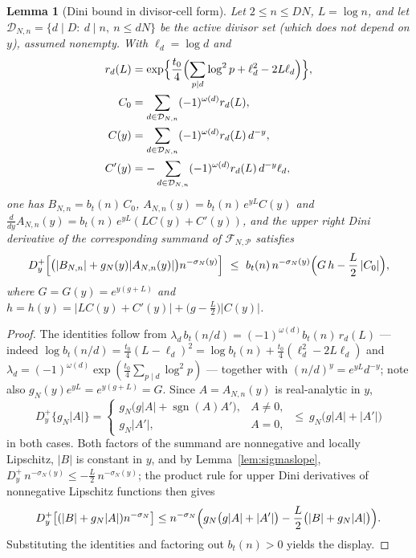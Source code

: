 \documentclass[11pt]{article}
\newtheorem{lemma}[theorem]{Lemma}
\theoremstyle{definition}
\newcommand{\calP}{\mathcal{P}}
\begin{document}
\begin{lemma}[Dini bound in divisor-cell form]\label{lem:dini}
Let $2\le n\le DN$, $L=\log n$, and let
$\mathcal D_{N,n}=\{d\mid D:\ d\mid n,\ n\le dN\}$ be the active
divisor set (which does not depend on $y$), assumed nonempty. With
$\ell_d=\log d$ and
\begin{align*}
r_d(L) &= \exp\Bigl\{\frac{t_0}4\Bigl(\sum_{p\mid d}\log^2p
+\ell_d^2-2L\ell_d\Bigr)\Bigr\},
\\
C_0 &= \sum_{d\in\mathcal D_{N,n}}(-1)^{\omega(d)}r_d(L),
\\
C(y) &= \sum_{d\in\mathcal D_{N,n}}(-1)^{\omega(d)}r_d(L)\,d^{-y},
\\
C'(y) &= -\sum_{d\in\mathcal D_{N,n}}(-1)^{\omega(d)}r_d(L)\,
d^{-y}\ell_d,
\end{align*}
one has $B_{N,n}=b_t(n)\,C_0$,
$A_{N,n}(y)=b_t(n)\,e^{yL}C(y)$ and
$\frac{d}{dy}A_{N,n}(y)=b_t(n)\,e^{yL}(LC(y)+C'(y))$, and the upper
right Dini derivative of the corresponding summand of
$\mathcal F_{N,\calP}$ satisfies
\[
D^+_y\Bigl[\bigl(|B_{N,n}|+g_N(y)|A_{N,n}(y)|\bigr)
n^{-\sigma_N(y)}\Bigr]
\ \le\
b_t(n)\,n^{-\sigma_N(y)}
\Bigl(G\,h-\frac L2\,|C_0|\Bigr),
\]
where $G=G(y)=e^{y(g+L)}$ and
$h=h(y)=|LC(y)+C'(y)|+\bigl(g-\tfrac L2\bigr)|C(y)|$.
\end{lemma}

\begin{proof}
The identities follow from
$\lambda_d\,b_t(n/d)=(-1)^{\omega(d)}b_t(n)\,r_d(L)$ --- indeed
$\log b_t(n/d)=\frac{t_0}4(L-\ell_d)^2
=\log b_t(n)+\frac{t_0}4(\ell_d^2-2L\ell_d)$ and
$\lambda_d=(-1)^{\omega(d)}\exp(\frac{t_0}4\sum_{p\mid d}\log^2p)$
--- together with $(n/d)^y=e^{yL}d^{-y}$; note also
$g_N(y)e^{yL}=e^{y(g+L)}=G$. Since $A=A_{N,n}(y)$ is real-analytic
in $y$,
\[
D^+_y\bigl\{g_N|A|\bigr\}
=\begin{cases}
g_N\bigl(g|A|+\operatorname{sgn}(A)A'\bigr),&A\neq0,\\
g_N|A'|,&A=0,
\end{cases}
\ \le\ g_N\bigl(g|A|+|A'|\bigr)
\]
in both cases. Both factors of the summand are nonnegative and
locally Lipschitz, $|B|$ is constant in $y$, and by
Lemma~\ref{lem:sigmaslope},
$D^+_y\,n^{-\sigma_N(y)}\le-\frac L2\,n^{-\sigma_N(y)}$; the
product rule for upper Dini derivatives of nonnegative Lipschitz
functions then gives
\[
D^+_y\bigl[(|B|+g_N|A|)n^{-\sigma_N}\bigr]
\le n^{-\sigma_N}\Bigl(g_N\bigl(g|A|+|A'|\bigr)
-\frac L2\bigl(|B|+g_N|A|\bigr)\Bigr).
\]
Substituting the identities and factoring out $b_t(n)>0$ yields the
display.
\end{proof}
\end{document}
